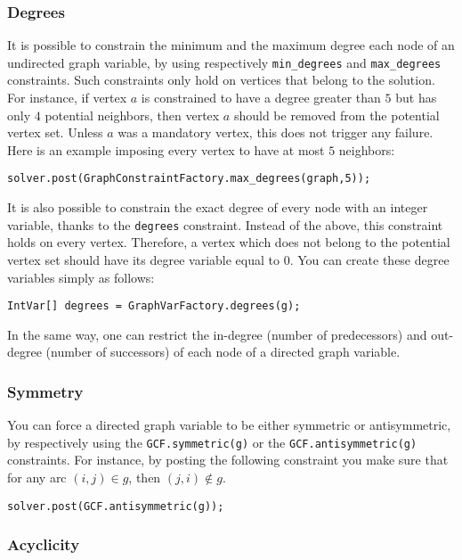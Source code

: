 \documentclass{article}
\begin{document}
\subsubsection{Degrees}

It is possible to constrain the minimum and the maximum degree each node of an undirected graph variable, by using respectively \texttt{min\_degrees} and \texttt{max\_degrees} constraints. 
Such constraints only hold on vertices that belong to the solution. For instance, if vertex $a$ is constrained to have a degree greater than $5$ but has only $4$ potential neighbors, then vertex $a$ should be removed from the potential vertex set. Unless $a$ was a mandatory vertex, this does not trigger any failure. Here is an example imposing every vertex to have at most $5$ neighbors: 
\begin{lstlisting}
solver.post(GraphConstraintFactory.max_degrees(graph,5));
\end{lstlisting}

It is also possible to constrain the exact degree of every node with an integer variable, thanks to the \texttt{degrees} constraint. Instead of the above, this constraint holds on every vertex. Therefore, a vertex which does not belong to the potential vertex set should have its degree variable equal to $0$. You can create these degree variables simply as follows:
\begin{lstlisting}
IntVar[] degrees = GraphVarFactory.degrees(g);
\end{lstlisting}

In the same way, one can restrict the in-degree (number of predecessors) and out-degree (number of successors) of each node of a directed graph variable.  
 
\subsubsection{Symmetry}

You can force a directed graph variable to be either symmetric or antisymmetric, by respectively using the \texttt{GCF.symmetric(g)} or the \texttt{GCF.antisymmetric(g)} constraints. For instance, by posting the following constraint you make sure that for any arc $(i,j)\in g$, then $(j,i) \notin g$.
\begin{lstlisting}
solver.post(GCF.antisymmetric(g));
\end{lstlisting}  

\subsubsection{Acyclicity}
\end{document}
